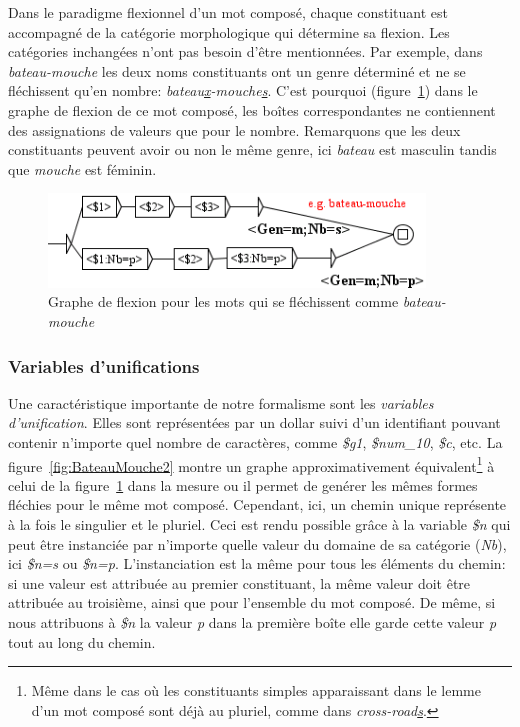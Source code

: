 \bigskip
\noindent Dans le paradigme flexionnel d'un mot composé, chaque constituant est accompagné de la
catégorie morphologique qui détermine sa flexion. Les catégories inchangées n'ont pas besoin d'être
mentionnées. Par exemple, dans \emph{bateau-mouche} les deux noms constituants ont un genre
déterminé et ne se fléchissent qu'en nombre: \emph{bateau\underline{x}-mouche\underline{s}}. C'est
pourquoi (figure~\ref{fig:BateauMouche1}) dans le graphe de flexion de ce mot composé, les boîtes
correspondantes ne contiennent des assignations de  valeurs que pour le nombre. Remarquons que les
deux  constituants peuvent avoir ou non le même genre, ici \emph{bateau} est masculin tandis que
\emph{mouche} est féminin.

\begin{figure}[!htb]
  \centering
  \includegraphics[width=10cm]{resources/img/BateauMouche1.png}
  \caption{Graphe de flexion pour les mots qui se fléchissent comme \emph{bateau-mouche}}
  \label{fig:BateauMouche1}
\end{figure}

\subsubsection{Variables d'unifications}
Une caractéristique importante de notre formalisme sont les \textit{variables d'unification}.
Elles sont représentées par un dollar suivi d'un identifiant pouvant
contenir n'importe quel nombre de caractères, comme \emph{\$g1}, \emph{\$num\_10}, \emph{\$c}, etc.
La figure~\ref{fig:BateauMouche2} montre un graphe approximativement équivalent\footnote{Même dans
le cas où les constituants simples apparaissant dans le lemme d'un mot composé sont déjà au
pluriel, comme dans \emph{cross-road\underline{s}}.} à celui de la figure~\ref{fig:BateauMouche1}
dans la mesure ou il permet de genérer les mêmes formes fléchies pour le même mot composé.
Cependant, ici, un chemin unique représente à la fois le singulier et le pluriel. Ceci est rendu
possible grâce à la variable \emph{\$n} qui peut être instanciée par n'importe quelle valeur du
domaine de sa catégorie (\emph{Nb}), ici \emph{\$n=s} ou \emph{\$n=p}. L'instanciation est la même
pour tous les éléments du chemin: si une valeur est attribuée au premier constituant, la même valeur
doit être attribuée au troisième, ainsi que pour l'ensemble du mot composé. De même, si nous
attribuons à \emph{\$n} la valeur \emph{p} dans la première boîte elle garde cette valeur \emph{p}
tout au long du chemin.

